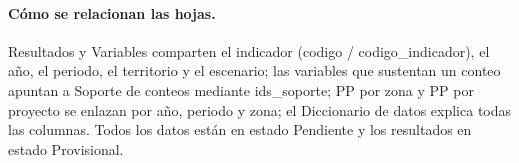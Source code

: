 \documentclass[11pt,letterpaper]{article}
\begin{document}
\paragraph{Cómo se relacionan las hojas.} Resultados y Variables comparten el indicador (codigo / codigo\_indicador), el año, el periodo, el territorio y el escenario; las variables que sustentan un conteo apuntan a Soporte de conteos mediante ids\_soporte; PP por zona y PP por proyecto se enlazan por año, periodo y zona; el Diccionario de datos explica todas las columnas. Todos los datos están en estado Pendiente y los resultados en estado Provisional.
\end{document}
